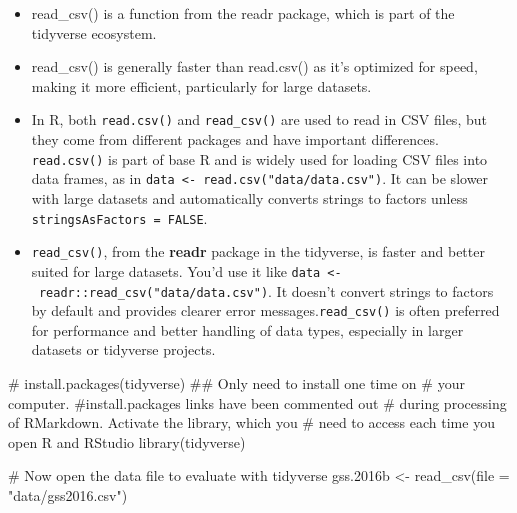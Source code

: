 \documentclass[
  letterpaper,
  DIV=11,
  numbers=noendperiod]{scrreprt}
\newenvironment{Shaded}{\begin{snugshade}}{\end{snugshade}}
\newcommand{\AttributeTok}[1]{\textcolor[rgb]{0.40,0.45,0.13}{#1}}
\newcommand{\CommentTok}[1]{\textcolor[rgb]{0.37,0.37,0.37}{#1}}
\newcommand{\FloatTok}[1]{\textcolor[rgb]{0.68,0.00,0.00}{#1}}
\newcommand{\FunctionTok}[1]{\textcolor[rgb]{0.28,0.35,0.67}{#1}}
\newcommand{\NormalTok}[1]{\textcolor[rgb]{0.00,0.23,0.31}{#1}}
\newcommand{\OtherTok}[1]{\textcolor[rgb]{0.00,0.23,0.31}{#1}}
\newcommand{\StringTok}[1]{\textcolor[rgb]{0.13,0.47,0.30}{#1}}
\begin{document}
\begin{itemize}
\item
  read\_csv() is a function from the readr package, which is part of the
  tidyverse ecosystem.
\item
  read\_csv() is generally faster than read.csv() as it's optimized for
  speed, making it more efficient, particularly for large datasets.
\item
  In R, both \texttt{read.csv()} and \texttt{read\_csv()} are used to
  read in CSV files, but they come from different packages and have
  important differences. \texttt{read.csv()} is part of base R and is
  widely used for loading CSV files into data frames, as in
  \texttt{data\ \textless{}-\ read.csv("data/data.csv")}. It can be
  slower with large datasets and automatically converts strings to
  factors unless \texttt{stringsAsFactors\ =\ FALSE}.
\item
  \texttt{read\_csv()}, from the \textbf{readr} package in the
  tidyverse, is faster and better suited for large datasets. You'd use
  it like
  \texttt{data\ \textless{}-\ readr::read\_csv("data/data.csv")}. It
  doesn't convert strings to factors by default and provides clearer
  error messages.\texttt{read\_csv()} is often preferred for performance
  and better handling of data types, especially in larger datasets or
  tidyverse projects.
\end{itemize}

\begin{Shaded}
\begin{Highlighting}[]
\CommentTok{\# install.packages(tidyverse) \#\# Only need to install one time on}
\CommentTok{\# your computer. \#install.packages links have been commented out}
\CommentTok{\# during processing of RMarkdown.  Activate the library, which you}
\CommentTok{\# need to access each time you open R and RStudio}
\FunctionTok{library}\NormalTok{(tidyverse)}
\end{Highlighting}
\end{Shaded}

\begin{Shaded}
\begin{Highlighting}[]
\CommentTok{\# Now open the data file to evaluate with tidyverse}
\NormalTok{gss}\FloatTok{.2016}\NormalTok{b }\OtherTok{\textless{}{-}} \FunctionTok{read\_csv}\NormalTok{(}\AttributeTok{file =} \StringTok{"data/gss2016.csv"}\NormalTok{)}
\end{Highlighting}
\end{Shaded}
\end{document}
